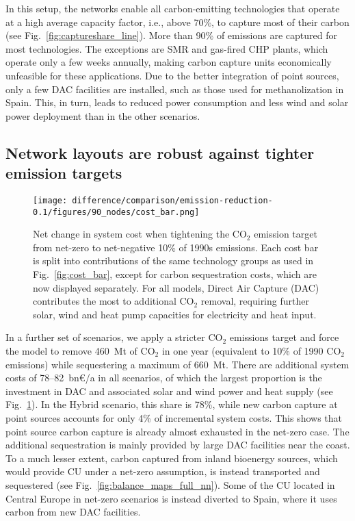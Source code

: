 \documentclass[twocolumn]{article}
\newcommand{\carbon}{CO$_2$}
\newcommand{\hybridscenario}{Hybrid scenario}
\begin{document}
In this setup, the networks enable all carbon-emitting technologies that operate at a high average capacity factor, i.e., above 70\%, to capture most of their carbon (see Fig.~\ref{fig:captureshare_line}). More than 90\% of emissions are captured for most technologies. The exceptions are SMR and gas-fired CHP plants, which operate only a few weeks annually, making carbon capture units economically unfeasible for these applications.
Due to the better integration of point sources, only a few DAC facilities are installed, such as those used for methanolization in Spain. This, in turn, leads to reduced power consumption and less wind and solar power deployment than in the other scenarios.


\subsection*{Network layouts are robust against tighter emission targets}
\begin{figure}[htb!]
    \centering
    \texttt{[image: difference/comparison/emission-reduction-0.1/figures/90\_nodes/cost\_bar.png]}
    \caption[short]{Net change in system cost when tightening the \carbon{} emission target from net-zero to net-negative 10\% of 1990s emissions. Each cost bar is split into contributions of the same technology groups as used in Fig.~\ref{fig:cost_bar}, except for carbon sequestration costs, which are now displayed separately. For all models, Direct Air Capture (DAC) contributes the most to additional \carbon{} removal, requiring further solar, wind and heat pump capacities for electricity and heat input.}
    \label{fig:net-negative_cost_bar}
\end{figure}


In a further set of scenarios, we apply a stricter \carbon{} emissions target and force the model to remove 460~Mt of \carbon{} in one year (equivalent to 10\% of 1990 \carbon{} emissions) while sequestering a maximum of 660~Mt. There are additional system costs of 78--82~bn€/a in all scenarios, of which the largest proportion is the investment in DAC and associated solar and wind power and heat supply (see Fig.~\ref{fig:net-negative_cost_bar}). In the \hybridscenario{}, this share is 78\%, while new carbon capture at point sources accounts for only 4\% of incremental system costs. This shows that point source carbon capture is already almost exhausted in the net-zero case. The additional sequestration is mainly provided by large DAC facilities near the coast. To a much lesser extent, carbon captured from inland bioenergy sources, which would provide CU under a net-zero assumption, is instead transported and sequestered (see Fig.~\ref{fig:balance_maps_full_nn}). Some of the CU located in Central Europe in net-zero scenarios is instead diverted to Spain, where it uses carbon from new DAC facilities.
\end{document}
